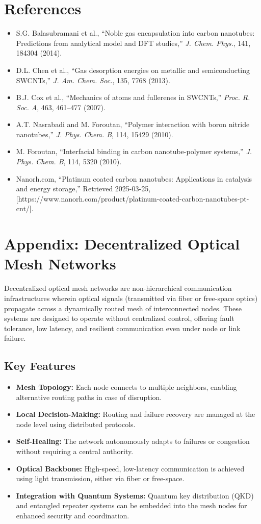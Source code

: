 \documentclass[11pt]{article}
\begin{document}
	\section{References}
	\begin{itemize}
		\item S.G. Balasubramani et al., ``Noble gas encapsulation into carbon nanotubes: Predictions from analytical model and DFT studies,'' \textit{J. Chem. Phys.}, 141, 184304 (2014).
		\item D.L. Chen et al., ``Gas desorption energies on metallic and semiconducting SWCNTs,'' \textit{J. Am. Chem. Soc.}, 135, 7768 (2013).
		\item B.J. Cox et al., ``Mechanics of atoms and fullerenes in SWCNTs,'' \textit{Proc. R. Soc. A}, 463, 461--477 (2007).
		\item A.T. Nasrabadi and M. Foroutan, ``Polymer interaction with boron nitride nanotubes,'' \textit{J. Phys. Chem. B}, 114, 15429 (2010).
		\item M. Foroutan, ``Interfacial binding in carbon nanotube-polymer systems,'' \textit{J. Phys. Chem. B}, 114, 5320 (2010).
		\item Nanorh.com, ``Platinum coated carbon nanotubes: Applications in catalysis and energy storage,'' Retrieved 2025-03-25, [https://www.nanorh.com/product/platinum-coated-carbon-nanotubes-pt-cnt/].
	\end{itemize}
	
	\section*{Appendix: Decentralized Optical Mesh Networks}
	Decentralized optical mesh networks are non-hierarchical communication infrastructures wherein optical signals (transmitted via fiber or free-space optics) propagate across a dynamically routed mesh of interconnected nodes. These systems are designed to operate without centralized control, offering fault tolerance, low latency, and resilient communication even under node or link failure.
	
	\subsection*{Key Features}
	\begin{itemize}
		\item \textbf{Mesh Topology:} Each node connects to multiple neighbors, enabling alternative routing paths in case of disruption.
		\item \textbf{Local Decision-Making:} Routing and failure recovery are managed at the node level using distributed protocols.
		\item \textbf{Self-Healing:} The network autonomously adapts to failures or congestion without requiring a central authority.
		\item \textbf{Optical Backbone:} High-speed, low-latency communication is achieved using light transmission, either via fiber or free-space.
		\item \textbf{Integration with Quantum Systems:} Quantum key distribution (QKD) and entangled repeater systems can be embedded into the mesh nodes for enhanced security and coordination.
	\end{itemize}
	
\end{document}
